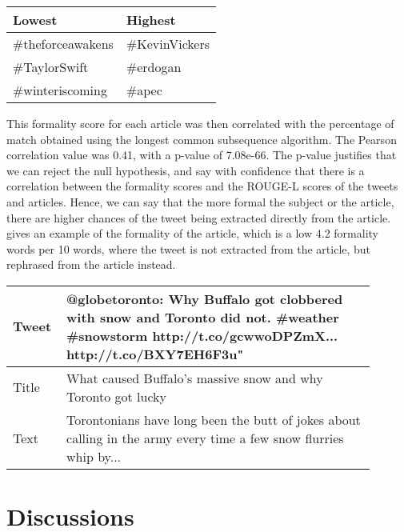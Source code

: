 \begin{table}[htbp]
\centering
\begin{tabular}{|l|l|}
\hline
Lowest  & Highest  \\ \hline
\#theforceawakens       & \#KevinVickers           \\
\#TaylorSwift           & \#erdogan                \\
\#winteriscoming        & \#apec                  \\ \hline
\end{tabular}
\label{tab:formal}
\end{table}

This formality score for each article was then correlated with the percentage of match obtained using the longest common subsequence algorithm. The Pearson correlation value was 0.41, with a p-value of 7.08e-66. The p-value justifies that we can reject the null hypothesis, and say with confidence that there is a correlation between the formality scores and the ROUGE-L scores of the tweets and articles. Hence, we can say that the more formal the subject or the article, there are higher chances of the tweet being extracted directly from the article.  gives an example of the formality of the article, which is a low 4.2 formality words per 10 words, where the tweet is not extracted from the article, but rephrased from the article instead.

\begin{table}[htbp]
\centering
\begin{tabular}{|p{0.1\linewidth}|p{0.8\linewidth}|}
\hline
Tweet &  @globetoronto: Why Buffalo got clobbered with snow and Toronto did not. \#weather \#snowstorm http://t.co/gcwwoDPZmX... http://t.co/BXY7EH6F3u" \\ \hline
Title & What caused Buffalo’s massive snow and why Toronto got lucky \\  \hline
Text  & Torontonians have long been the butt of jokes about calling in the army every time a few snow flurries whip by... \\ \hline
\end{tabular}
\label{tab:formal}
\end{table}

\section{Discussions}

